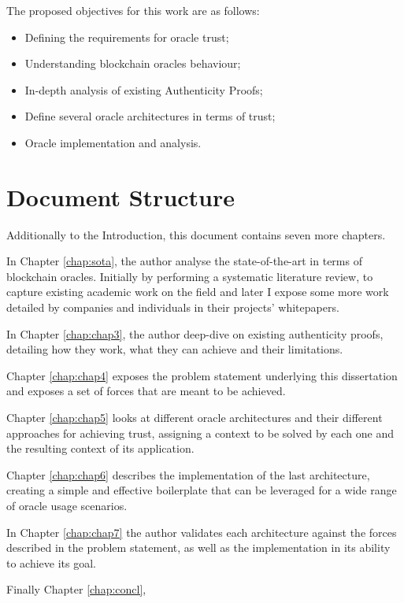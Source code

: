 The proposed objectives for this work are as follows:
\begin{itemize}
  \item Defining the requirements for oracle trust;
  \item Understanding blockchain oracles behaviour;
  \item In-depth analysis of existing Authenticity Proofs;
  \item Define several oracle architectures in terms of trust;
  \item Oracle implementation and analysis.
\end{itemize}

\section{Document Structure} \label{sec:struct}

Additionally to the Introduction, this document contains seven more chapters.

In Chapter \ref{chap:sota}, the author analyse the state-of-the-art in terms of blockchain oracles. Initially by performing a systematic literature review, to capture existing academic work on the field and later I expose some more work detailed by companies and individuals in their projects' whitepapers.

In Chapter \ref{chap:chap3}, the author deep-dive on existing authenticity proofs, detailing how they work, what they can achieve and their limitations.

Chapter \ref{chap:chap4} exposes the problem statement underlying this dissertation and exposes a set of forces that are meant to be achieved.

Chapter \ref{chap:chap5} looks at different oracle architectures and their different approaches for achieving trust, assigning a context to be solved by each one and the resulting context of its application.

Chapter \ref{chap:chap6} describes the implementation of the last architecture, creating a simple and effective boilerplate that can be leveraged for a wide range of oracle usage scenarios.

In Chapter \ref{chap:chap7} the author validates each architecture against the forces described in the problem statement, as well as the implementation in its ability to achieve its goal.

Finally Chapter \ref{chap:concl},


